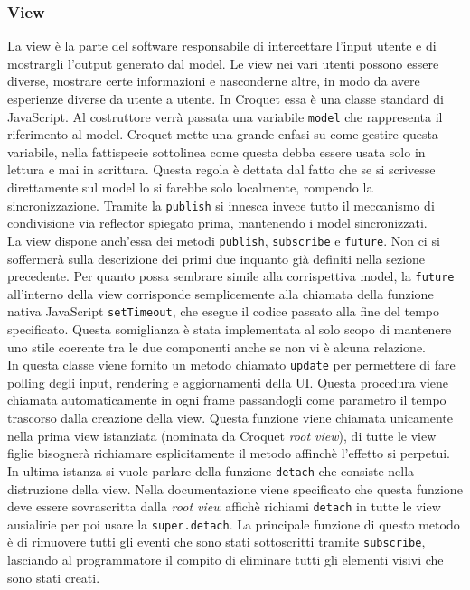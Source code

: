 \subsubsection{View}\label{subsubsec:Croquet_view}
La view è la parte del software responsabile di intercettare l'input utente e di mostrargli l'output generato dal model. Le view nei vari utenti possono essere
diverse, mostrare certe informazioni e nasconderne altre, in modo da avere esperienze diverse da utente a utente. In Croquet essa è una classe standard di JavaScript.
Al costruttore verrà passata una variabile \texttt{model} che rappresenta il riferimento al model. Croquet mette una grande enfasi su come gestire questa variabile, nella fattispecie
sottolinea come questa debba essere usata solo in lettura e mai in scrittura. Questa regola è dettata dal fatto che se si scrivesse direttamente sul model lo si farebbe solo 
localmente, rompendo la sincronizzazione. Tramite la \texttt{publish} si innesca invece tutto il meccanismo di condivisione via reflector spiegato prima, mantenendo i model
sincronizzati.\\
\newline
La view dispone anch'essa dei metodi \texttt{publish}, \texttt{subscribe} e \texttt{future}. Non ci si soffermerà sulla descrizione dei primi due inquanto già definiti
nella sezione precedente. Per quanto possa sembrare simile alla corrispettiva model, la \texttt{future} all'interno della view corrisponde semplicemente alla chiamata della 
funzione nativa JavaScript \texttt{setTimeout}, che esegue il codice passato alla fine del tempo specificato. Questa somiglianza è stata implementata al solo scopo di mantenere uno stile
coerente tra le due componenti anche se non vi è alcuna relazione.\\
\newline
In questa classe viene fornito un metodo chiamato \texttt{update} per permettere di fare polling degli input, rendering e aggiornamenti della UI. Questa procedura viene chiamata
automaticamente in ogni frame passandogli come parametro il tempo trascorso dalla creazione della view. Questa funzione viene chiamata unicamente nella prima
view istanziata (nominata da Croquet \textit{root view}), di tutte le view figlie bisognerà richiamare esplicitamente il metodo affinchè l'effetto si perpetui.\\
\newline
In ultima istanza si vuole parlare della funzione \texttt{detach} che consiste nella distruzione della view. Nella documentazione viene specificato che questa funzione deve essere
sovrascritta dalla \textit{root view} affichè richiami \texttt{detach} in tutte le view ausialirie per poi usare la \texttt{super.detach}. La principale funzione di questo metodo
è di rimuovere tutti gli eventi che sono stati sottoscritti tramite \texttt{subscribe}, lasciando al programmatore il compito di eliminare tutti gli elementi visivi che sono stati
creati.\\
